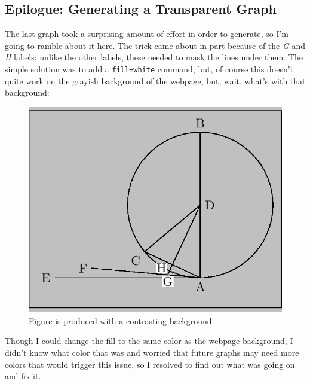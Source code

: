 \documentclass{article}
\begin{document}
\subsection{Epilogue: Generating a Transparent Graph}
The last graph took a surprising amount of effort in order to generate, so I'm going to ramble about it here.  The trick came about in part because of the \textit{G} and \textit{H} labels; unlike the other labels, these needed to mask the lines under them.  The simple solution was to add a \texttt{fill=white} command, but, of course this doesn't quite work on the grayish background of the webpage, but, wait, what's with that background:
\begin{figure}
\includegraphics[scale=0.5]{files/blog/2019_02_21_math_euclid_pt1/2019_02_21_broken.png}
\caption{Figure is produced with a contrasting background.}
\end{figure}
Though I could change the fill to the same color as the webpage background, I didn't know what color that was and worried that future graphs may need more colors that would trigger this issue, so I resolved to find out what was going on and fix it.
\end{document}
